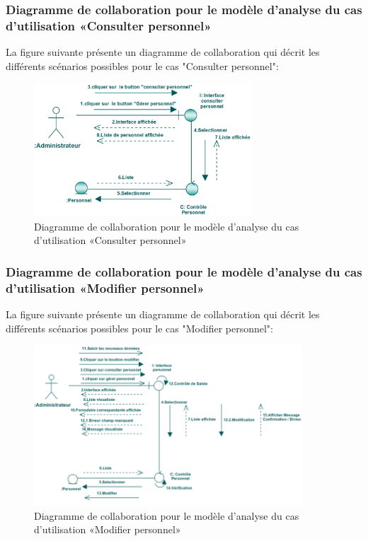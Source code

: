 \documentclass[12 pt ]{report}
\begin{document}
\subsubsection{Diagramme de collaboration pour le modèle d’analyse du cas d'utilisation                                       «Consulter personnel»}
La figure suivante présente un diagramme de collaboration qui décrit les différents
scénarios possibles pour le cas "Consulter personnel":
\begin{figure}[h]
 \begin{center}
\includegraphics[width= 14 cm ,height=  5cm]{collaconsper.PNG}
\caption{Diagramme de collaboration pour le modèle d’analyse du cas d'utilisation                                       «Consulter personnel»}

\end{center}
\end{figure}
\subsubsection{Diagramme de collaboration pour le modèle d’analyse du cas d'utilisation                                       «Modifier personnel»}
La figure suivante présente un diagramme de collaboration qui décrit les différents
scénarios possibles pour le cas "Modifier personnel":
\begin{figure}[h]
 \begin{center}
\includegraphics[width= 14 cm ,height=  6cm]{colla_adm_modifierpersonnel.PNG}
\caption{Diagramme de collaboration pour le modèle d’analyse du cas d'utilisation                                       «Modifier personnel»}

\end{center}
\end{figure}
\end{document}
